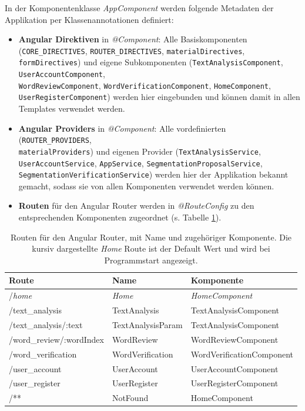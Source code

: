 In der Komponentenklasse \textit{AppComponent} werden folgende Metadaten der Applikation per Klassenannotationen definiert:
\begin{itemize}
	\item \textbf{Angular Direktiven} in \textit{@Component}: Alle Basiskomponenten (\texttt{CORE\_DIRECTIVES}, \texttt{ROUTER\_DIRECTIVES}, \texttt{materialDirectives},
	\texttt{formDirectives}) und eigene Subkomponenten (\texttt{TextAnalysisComponent}, \texttt{UserAccountComponent},\\
	\texttt{WordReviewComponent}, \texttt{WordVerificationComponent}, \texttt{HomeComponent},\\
	\texttt{UserRegisterComponent}) werden hier eingebunden und können damit in allen Templates verwendet werden.
	
	\item \textbf{Angular Providers} in \textit{@Component}: Alle vordefinierten (\texttt{ROUTER\_PROVIDERS},\\ \texttt{materialProviders}) und eigenen Provider (\texttt{TextAnalysisService},\\
	\texttt{UserAccountService}, \texttt{AppService}, \texttt{SegmentationProposalService},\\ \texttt{SegmentationVerificationService}) werden hier der Applikation bekannt gemacht, sodass sie von allen Komponenten verwendet werden können.
	
	\item \textbf{Routen} für den Angular Router werden in \textit{@RouteConfig} zu den entsprechenden Komponenten zugeordnet (s. Tabelle \ref{table:routeconfig}).
\end{itemize}

\begin{table}
	\centering
	\begin{tabular}{|l|l|l|}
		\hline
		\textbf{Route} & \textbf{Name} & \textbf{Komponente}\\
		\hline
		\hline
		/\textit{home} & \textit{Home} & \textit{HomeComponent} \\
		\hline
		/text\_analysis & TextAnalysis & TextAnalysisComponent \\
		\hline
		/text\_analysis/:text & TextAnalysisParam & TextAnalysisComponent \\
		\hline
		/word\_review/:wordIndex & WordReview & WordReviewComponent \\
		\hline
		/word\_verification & WordVerification & WordVerificationComponent \\
		\hline
		/user\_account & UserAccount & UserAccountComponent \\
		\hline
		/user\_register & UserRegister & UserRegisterComponent \\
		\hline
		/** & NotFound & HomeComponent \\
		\hline
	\end{tabular}
	\caption{Routen für den Angular Router, mit Name und zugehöriger Komponente. Die kursiv dargestellte \textit{Home} Route ist der Default Wert und wird bei Programmstart angezeigt.}
	\label{table:routeconfig}
\end{table}

